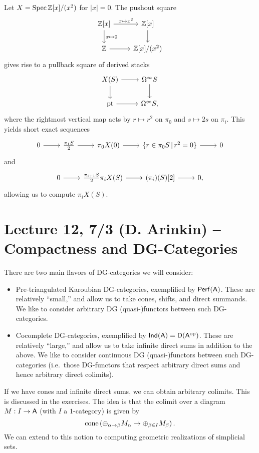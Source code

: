 \documentclass{amsart}
\begin{document}
\begin{ex}
	Let $X = \operatorname{Spec} \mathbb{Z}[x] / (x^2)$ for $|x| = 0$.
	The pushout square
	\[
		\begin{tikzcd}
			{\ZZ[x]} \rar["x \mapsto x^2"] \dar["x \mapsto 0"] & \ZZ[x] \dar \\
			\ZZ \rar & \ZZ[x] / (x^2)
		\end{tikzcd}
	\]
	gives rise to a pullback square of derived stacks
	\[
		\begin{tikzcd}
			X(S) \rar \dar & \Omega^\infty S \dar \\
			\pt \rar & \Omega^\infty S,
		\end{tikzcd}
	\]
	where the rightmost vertical map acts by $r \mapsto r^2$ on $\pi_0$ and $s \mapsto 2s$ on $\pi_i$.
	This yields short exact sequences
	\[
		\begin{tikzcd}
			0 \rar & \frac{\pi_1 S}{2} \rar & \pi_0 X(0) \rar & \{ r \in \pi_0 S \, | \, r^2 = 0 \} \rar & 0
		\end{tikzcd}
	\]
	and
	\[
		\begin{tikzcd}
			0 \rar & \frac{\pi_{i+1} S}{2} \rar \pi_i X(S) \rar & (\pi_i)(S)[2] \rar & 0,
		\end{tikzcd}
	\]
	allowing us to compute $\pi_i X(S)$.
\end{ex}

\section{Lecture 12, 7/3 (D. Arinkin) -- Compactness and DG-Categories}

There are two main flavors of DG-categories we will consider:
\begin{itemize}
	\item Pre-triangulated Karoubian DG-categories, exemplified by $\mathsf{Perf}(\mathsf{A})$.
		These are relatively ``small,'' and allow us to take cones, shifts, and direct summands.
		We like to consider arbitrary DG (quasi-)functors between such DG-categories.
	\item Cocomplete DG-categories, exemplified by $\mathsf{Ind}(\mathsf{A}) = \mathsf{D}(\mathsf{A}^{\mathrm{op}})$.
		These are relatively ``large,'' and allow us to take infinite direct sums in addition to the above.
		We like to consider continuous DG (quasi-)functors between such DG-categories (i.e.\ those DG-functors that respect arbitrary direct sums and hence arbitrary direct colimits).
\end{itemize}

\begin{rmk}
	If we have cones and infinite direct sums, we can obtain arbitrary colimits.
	This is discussed in the exercises.
	The idea is that the colimit over a diagram $M: I \to \mathsf{A}$ (with $I$ a $1$-category) is given by
	\[
		\operatorname{cone}\left( \oplus_{\alpha \to \beta} M_\alpha \to \oplus_{\beta \in I} M_\beta \right).
	\]
	We can extend to this notion to computing geometric realizations of simplicial sets.
\end{rmk}
\end{document}

